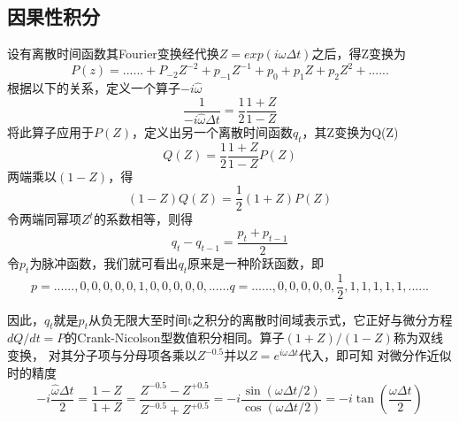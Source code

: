 \subsection{因果性积分}
\label{sec:4.6.4}

设有离散时间函数其Fourier变换经代换$Z=exp(i\omega \Delta t)$之后，得Z变换为
\begin{equation}
P(z)=......+P_{-2}Z^{-2}+p_{-1}Z^{-1}+p_0+p_1Z+p_2Z^2+......
\label{eq:ex4.6.8}
\end{equation}
根据以下的关系，定义一个算子$-i\hat{\omega}$
\begin{equation}
\frac{1}{-i\hat{\omega}\Delta t}=\frac{1}{2}\frac{1+Z}{1-Z}
\label{eq:ex4.6.9}
\end{equation}
将此算子应用于$P(Z)$，定义出另一个离散时间函数$q_t$，其Z变换为Q(Z)
\begin{equation}
Q(Z)=\frac{1}{2}\frac{1+Z}{1-Z}P(Z)
\label{eq:ex4.6.10}
\end{equation}
两端乘以$(1-Z)$，得
\begin{equation}
(1-Z)Q(Z)=\frac{1}{2}(1+Z)P(Z)
\label{eq:ex4.6.11}
\end{equation}
令两端同幂项$Z^t$的系数相等，则得
\begin{equation}
q_t-q_{t-1}=\frac{p_t+p_{t-1}}{2}
\label{eq:ex4.6.12}
\end{equation}
令$p_t$为脉冲函数，我们就可看出$q_t$原来是一种阶跃函数，即
\begin{subequations}
\begin{equation}
p=......,0,0,0,0,0,1,0,0,0,0,0,......
\label{eq:ex4.6.13a}
\end{equation}
\begin{equation}
q=......,0,0,0,0,0,\frac{1}{2},1,1,1,1,1,......
\label{eq:ex4.6.13b}
\end{equation}
\label{eq:ex4.6.13}
\end{subequations}

因此，$q_t$就是$p_t$从负无限大至时间t之积分的离散时间域表示式，它正好与微分方程
$dQ/dt=P$的Crank-Nicolson型数值积分相同。算子$(1+Z)/(1-Z)$称为双线变换，
对其分子项与分母项各乘以$Z^{-0.5}$并以$Z=e^{i\omega \Delta t}$代入，即可知
对微分作近似时的精度
\begin{subequations}
\begin{equation}
-i\frac{\hat{\omega}\Delta t}{2}=\frac{1-Z}{1+Z}=\frac{Z^{-0.5}-Z^{+0.5}}{Z^{-0.5}+Z^{+0.5}}
\label{eq:ex4.6.14a}
\end{equation}
\begin{equation}
=-i\frac{\sin(\omega \Delta t/2)}{\cos(\omega \Delta t/2)}=-i\tan(\frac{\omega\Delta t}{2})
\label{eq:ex4.6.14b}
\end{equation}
\label{eq:ex4.6.14}
\end{subequations}

